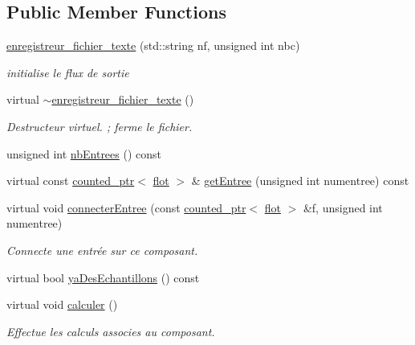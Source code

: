 \subsection*{Public Member Functions}
\begin{DoxyCompactItemize}
\item 
\hyperlink{classenregistreur__fichier__texte_ae421d362a8dbe086607541e97734c497}{enregistreur\-\_\-fichier\-\_\-texte} (std\-::string nf, unsigned int nbc)
\begin{DoxyCompactList}\small\item\em initialise le flux de sortie \end{DoxyCompactList}\item 
virtual \hyperlink{classenregistreur__fichier__texte_ae92b7cba4a2ffcb9055b23bfeb631ba0}{$\sim$enregistreur\-\_\-fichier\-\_\-texte} ()
\begin{DoxyCompactList}\small\item\em Destructeur virtuel. ; ferme le fichier. \end{DoxyCompactList}\item 
unsigned int \hyperlink{classenregistreur__fichier__texte_a0f686274b3cca79fba1d3c2227cd4950}{nb\-Entrees} () const 
\item 
virtual const \hyperlink{classcounted__ptr}{counted\-\_\-ptr}$<$ \hyperlink{classflot}{flot} $>$ \& \hyperlink{classenregistreur__fichier__texte_a065dcf79e74d6d7388dbb2909c0d2be2}{get\-Entree} (unsigned int numentree) const 
\item 
virtual void \hyperlink{classenregistreur__fichier__texte_a9da917c48db3891e757d971e8927dfda}{connecter\-Entree} (const \hyperlink{classcounted__ptr}{counted\-\_\-ptr}$<$ \hyperlink{classflot}{flot} $>$ \&f, unsigned int numentree)
\begin{DoxyCompactList}\small\item\em Connecte une entrée sur ce composant. \end{DoxyCompactList}\item 
virtual bool \hyperlink{classenregistreur__fichier__texte_ac412238ca34c019727aa6ddfbe9ae56e}{ya\-Des\-Echantillons} () const 
\item 
virtual void \hyperlink{classenregistreur__fichier__texte_a3c693001317b5940f3b61033c02fb2d7}{calculer} ()
\begin{DoxyCompactList}\small\item\em Effectue les calculs associes au composant. \end{DoxyCompactList}\end{DoxyCompactItemize}

